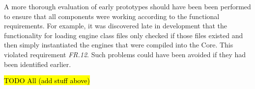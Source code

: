 \documentclass[10pt,a4paper]{article}
\begin{document}
A more thorough evaluation of early prototypes should have been been performed to ensure that all components were working according to the functional requirements. For example, it was discovered late in development that the functionality for loading engine class files only checked if those files existed and then simply instantiated the engines that were compiled into the Core. This violated requirement \emph{FR.12}. Such problems could have been avoided if they had been identified earlier.

\hl{TODO All (add stuff above)}


\clearpage



\end{document}
